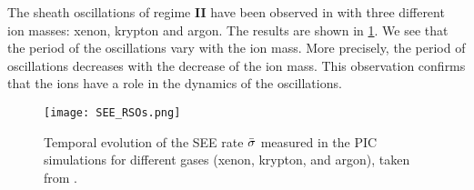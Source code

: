     
    The sheath oscillations of regime {\bf II} have been observed in \citet{croes2017} with three different ion masses: xenon, krypton and argon.
    The results are shown in \cref{fig-RSO_altern}.
    We see that the period of the oscillations vary with the ion mass.
    More precisely, the period of oscillations decreases with the decrease of the ion mass.
    This observation confirms that the ions have a role in the dynamics of the oscillations.
    
    \begin{figure}[hbt]
      \centering
      \texttt{[image: SEE\_RSOs.png]}
      \caption{Temporal evolution of the SEE rate $ \bar{\sigma }$ measured in the PIC simulations for different gases (xenon, krypton, and argon), taken from \citet{croes2017}.}
      \label{fig-RSO_altern}
    \end{figure}
    
    